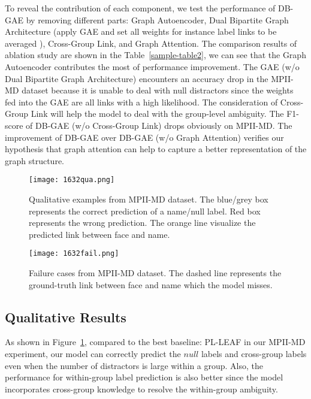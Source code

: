 \documentclass[letterpaper]{article} \usepackage{aaai20}  \usepackage{times}  \usepackage{helvet} \usepackage{courier}  \usepackage[hyphens]{url}  \usepackage{graphicx} \urlstyle{rm} \def\UrlFont{\rm}  \frenchspacing  \setlength{\pdfpagewidth}{8.5in}  \setlength{\pdfpageheight}{11in}  \frenchspacing
\begin{document}
To reveal the contribution of each component, we test the performance of DB-GAE by removing different parts: Graph Autoencoder, Dual Bipartite Graph Architecture (apply GAE and set all weights for instance label links to be averaged \cite{hullermeier2006learning,zhang2015solving}), Cross-Group Link, and Graph Attention.
The comparison results of ablation study are shown in the Table~\ref{sample-table2}, we can see that the Graph Autoencoder contributes the most of performance improvement. The GAE (w/o Dual Bipartite Graph Architecture) encounters an accuracy drop in the MPII-MD dataset because it is unable to deal with null distractors since the weights fed into the GAE are all links with a high likelihood. 
The consideration of Cross-Group Link will help the model to deal with the group-level ambiguity. The F1-score of DB-GAE (w/o Cross-Group Link) drops obviously on MPII-MD. The improvement of DB-GAE over DB-GAE (w/o Graph Attention) verifies our hypothesis that graph attention can help to capture a better representation of the graph structure.




\begin{figure}[!th]
  \texttt{[image: 1632qua.png]}
  \centering
\caption{Qualitative examples from MPII-MD dataset. The blue/grey box represents the correct prediction of a name/null label. Red box represents the wrong prediction. The orange line visualize the predicted link between face and name.}
  \label{fig:qualitative}
\end{figure}

\begin{figure}[!th]

  \texttt{[image: 1632fail.png]}
  \centering
\caption{Failure cases from MPII-MD dataset. The dashed line represents the ground-truth link between face and name which the model misses.}
  
  \label{fig:fail}
\end{figure}

\subsection{Qualitative Results}
As shown in Figure~\ref{fig:qualitative}, compared to the best baseline: PL-LEAF in our MPII-MD experiment, our model can correctly predict the $null$ labels and cross-group labels even when the number of distractors is large within a group. Also, the performance for within-group label prediction is also better since the model incorporates cross-group knowledge to resolve the within-group ambiguity.
\end{document}

